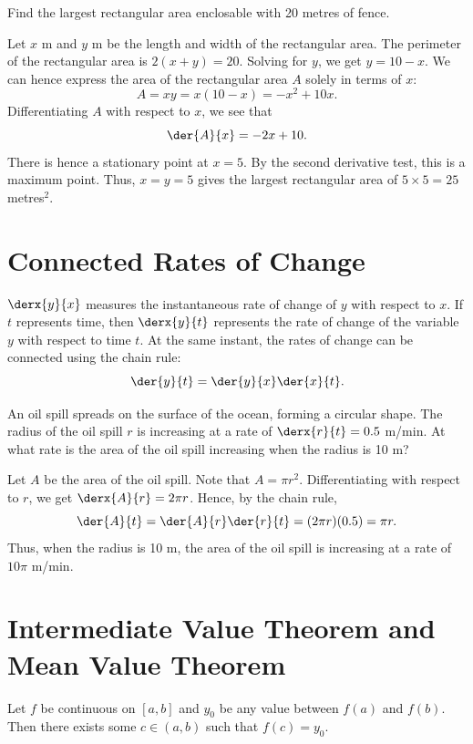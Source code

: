 \begin{sample}
    Find the largest rectangular area enclosable with 20 metres of fence.
\end{sample}
\begin{sampans}
    Let $x$ m and $y$ m be the length and width of the rectangular area. The perimeter of the rectangular area is $2(x + y) = 20$. Solving for $y$, we get $y = 10 - x$. We can hence express the area of the rectangular area $A$ solely in terms of $x$: \[A = xy = x(10 - x) = -x^2 + 10x.\] Differentiating $A$ with respect to $x$, we see that \[\der{A}{x} = -2x + 10.\] There is hence a stationary point at $x = 5$. By the second derivative test, this is a maximum point. Thus, $x = y = 5$ gives the largest rectangular area of $5 \times 5 = 25$ metres$^2$.
\end{sampans}

\section{Connected Rates of Change}

$\derx{y}{x}$ measures the instantaneous rate of change of $y$ with respect to $x$. If $t$ represents time, then $\derx{y}{t}$ represents the rate of change of the variable $y$ with respect to time $t$. At the same instant, the rates of change can be connected using the chain rule: \[\der{y}{t} = \der{y}{x} \der{x}{t}.\]

\begin{sample}
    An oil spill spreads on the surface of the ocean, forming a circular shape. The radius of the oil spill $r$ is increasing at a rate of $\derx{r}{t} = 0.5$ m/min. At what rate is the area of the oil spill increasing when the radius is 10 m?
\end{sample}
\begin{sampans}
    Let $A$ be the area of the oil spill. Note that $A = \pi r^2$. Differentiating with respect to $r$, we get $\derx{A}{r} = 2\pi r$. Hence, by the chain rule, \[\der{A}{t} = \der{A}{r} \der{r}{t} = (2\pi r) (0.5) = \pi r.\] Thus, when the radius is 10 m, the area of the oil spill is increasing at a rate of $10\pi$ m/min.
\end{sampans}

\section{Intermediate Value Theorem and Mean Value Theorem}

\begin{theorem}
    Let $f$ be continuous on $[a, b]$ and $y_0$ be any value between $f(a)$ and $f(b)$. Then there exists some $c \in (a, b)$ such that $f(c) = y_0$.
\end{theorem}

